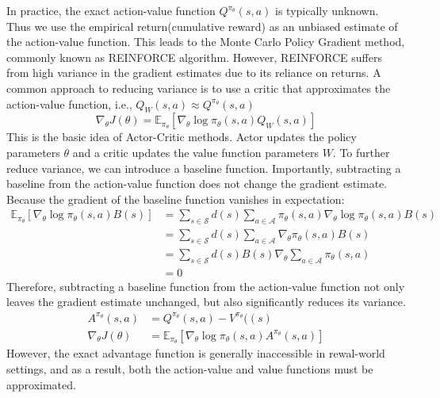 In practice, the exact action-value function $Q^{\pi_\theta}(s, a)$ is typically unknown.
Thus we use the empirical return(cumulative reward) as an unbiased estimate of the action-value function.
This leads to the Monte Carlo Policy Gradient method, commonly known as REINFORCE algorithm.
However, REINFORCE suffers from high variance in the gradient estimates due to its reliance on returns.
A common approach to reducing variance is to use a critic that approximates the action-value function, i.e.,  $Q_W(s, a) \approx Q^{\pi_\theta}(s, a)$
\begin{equation}
  \nabla_\theta J(\theta) = \mathbb{E}_{\pi_\theta} [\nabla_\theta \log \pi_\theta(s, a) Q_W(s, a)]
\end{equation}
This is the basic idea of Actor-Critic methods.
Actor updates the policy parameters $\theta$ and a critic updates the value function parameters $W$.
To further reduce variance, we can introduce a baseline function.
Importantly, subtracting a baseline from the action-value function does not change the gradient estimate.
Because the gradient of the baseline function vanishes in expectation:
\begin{equation}
  \begin{aligned}
    \mathbb{E}_{\pi_\theta} [\nabla_\theta \log \pi_\theta(s, a) B(s)]
    &= \sum_{s \in \mathcal{S}} d(s) \sum_{a \in \mathcal{A}} \pi_\theta(s, a) \nabla_\theta \log \pi_\theta(s, a) B(s) \\
    &= \sum_{s \in \mathcal{S}} d(s) \sum_{a \in \mathcal{A}} \nabla_\theta \pi_\theta(s, a) B(s) \\
    &= \sum_{s \in \mathcal{S}} d(s) B(s) \nabla_\theta \sum_{a \in \mathcal{A}} \pi_\theta(s, a) \\
    &= 0
  \end{aligned}
\end{equation}
Therefore, subtracting a baseline function from the action-value function not only leaves the gradient estimate unchanged, but also significantly reduces its variance.
\begin{equation}
  \begin{aligned}
    A^{\pi_\theta}(s, a) &= Q^{\pi_\theta}(s, a) - V^{\pi_\theta}((s) \\
    \nabla_\theta J(\theta) &= \mathbb{E}_{\pi_\theta} [\nabla_\theta \log \pi_\theta(s, a) A^{\pi_\theta}(s, a)]
  \end{aligned}
\end{equation}
However, the exact advantage function is generally inaccessible in rewal-world settings, and as a result, both the action-value and value functions must be approximated.
